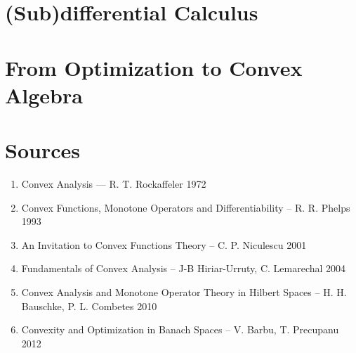 \documentclass[12pt]{scrartcl}
\renewcommand{\.}{\; . \;}
\begin{document}
\section{(Sub)differential Calculus}
\section{From Optimization to Convex Algebra}
\section*{Sources}
\begin{enumerate}
\item Convex Analysis --- R. T. Rockaffeler  1972
\item Convex Functions, Monotone Operators and Differentiability -- R. R. Phelps 1993
\item An Invitation to Convex Functions Theory --  C. P. Niculescu 2001
\item Fundamentals of Convex Analysis -- J-B Hiriar-Urruty, C. Lemarechal 2004 
\item Convex Analysis  and Monotone Operator Theory in Hilbert Spaces -- H. H. Bauschke, P. L. Combetes 2010
\item Convexity and Optimization in Banach Spaces -- V. Barbu, T. Precupanu 2012
\end{enumerate}
\end{document}
